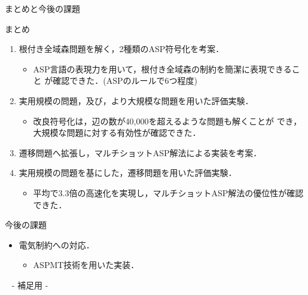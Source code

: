\documentclass[dvipdfmx,11pt]{beamer}
\begin{document}
\begin{frame}{まとめと今後の課題}
 \begin{block}{まとめ}
  \begin{enumerate}
   \item 根付き全域森問題を解く，2種類のASP符号化を考案．
   \begin{itemize}
	\item ASP言語の表現力を用いて，根付き全域森の制約を簡潔に表現できること
		  が確認できた．(ASPのルールで6つ程度)
   \end{itemize}
   \item 実用規模の問題，及び，より大規模な問題を用いた評価実験．
   \begin{itemize}
	\item 改良符号化は，辺の数が40,000を超えるような問題も解くことが
		  でき，大規模な問題に対する有効性が確認できた．
   \end{itemize}
   \item 遷移問題へ拡張し，マルチショットASP解法による実装を考案．
   \item 実用規模の問題を基にした，遷移問題を用いた評価実験．
   \begin{itemize}
	\item 平均で3.3倍の高速化を実現し，マルチショットASP解法の優位性が確認できた．
   \end{itemize}
  \end{enumerate}
 \end{block}
 
 \begin{alertblock}{今後の課題}
  \begin{itemize}
   \item 電気制約への対応．
		 \begin{itemize}
		  \item ASPMT技術を用いた実装．
		 \end{itemize}
  \end{itemize}
 \end{alertblock}
\end{frame}


\begin{frame}{~}
 \centering
 - 補足用 -
\end{frame} 
\end{document}
